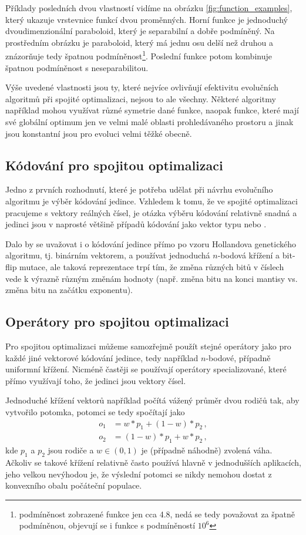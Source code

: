 Příklady posledních dvou vlastností vidíme na obrázku \ref{fig:function_examples}, který ukazuje vrstevnice funkcí dvou proměnných. Horní funkce je jednoduchý dvoudimenzionální paraboloid, který je separabilní a dobře podmíněný. Na prostředním obrázku je paraboloid, který má jednu osu delší než druhou a znázorňuje tedy špatnou podmíněnost\footnote{podmíněnost zobrazené funkce jen cca 4.8, nedá se tedy považovat za špatně podmíněnou, objevují se i funkce s podmíněností $10^6$}. Poslední funkce potom kombinuje špatnou podmíněnost s neseparabilitou.

Výše uvedené vlastnosti jsou ty, které nejvíce ovlivňují efektivitu evolučních algoritmů při spojité optimalizaci, nejsou to ale všechny. Některé algoritmy například mohou využívat různé symetrie dané funkce, naopak funkce, které mají své globální optimum jen ve velmi malé oblasti prohledávaného prostoru a jinak jsou konstantní jsou pro evoluci velmi těžké obecně.

\subsection{Kódování pro spojitou optimalizaci}

Jedno z prvních rozhodnutí, které je potřeba udělat při návrhu evolučního algoritmu je výběr kódování jedince. Vzhledem k tomu, že ve spojité optimalizaci pracujeme s vektory reálných čísel, je otázka výběru kódování relativně snadná a jedinci jsou v naprosté většině případů kódování jako vektor typu  nebo .



Dalo by se uvažovat i o kódování jedince přímo po vzoru Hollandova genetického algoritmu, tj. binárním vektorem, a používat jednoduchá $n$-bodová křížení a bit-flip mutace, ale taková reprezentace trpí tím, že změna různých bitů v číslech vede k výrazně různým změnám hodnoty (např. změna bitu na konci mantisy vs. změna bitu na začátku exponentu).

\subsection{Operátory pro spojitou optimalizaci}

Pro spojitou optimalizaci můžeme samozřejmě použít stejné operátory jako pro každé jiné vektorové kódování jedince, tedy například $n$-bodové, případně uniformní křížení. Nicméně častěji se používají operátory specializované, které přímo využívají toho, že jedinci jsou vektory čísel.

Jednoduché křížení vektorů například počítá vážený průměr dvou rodičů tak, aby vytvořilo potomka, potomci se tedy spočítají jako
\begin{align*}
o_1 & = w*p_1 + (1-w)* p_2\,, \\
o_2 & = (1-w)*p_1 + w* p_2\,,
\end{align*}
kde $p_1$ a $p_2$ jsou rodiče a $w \in (0,1)$ je (případně náhodně) zvolená váha. Ačkoliv se takové křížení relativně často používá hlavně v jednodušších aplikacích, jeho velkou nevýhodou je, že výslední potomci se nikdy nemohou dostat z konvexního obalu počáteční populace.